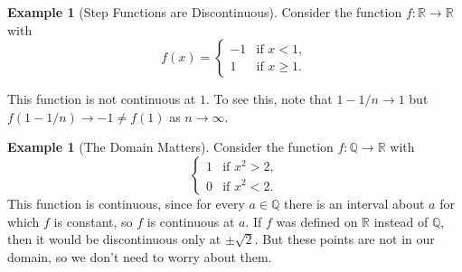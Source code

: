 \documentclass[11pt, a4paper]{article}
\theoremstyle{definition}
\newtheorem{example}[theorem]{Example}
\newcommand{\Q}{\mathbb{Q}}
\newcommand{\R}{\mathbb{R}}
\begin{document}
\begin{example}[Step Functions are Discontinuous]
	Consider the function $f : \R \rightarrow \R$ with
	$$
	f(x) = \begin{cases}
        -1 &\mbox{if } x < 1, \\
        1 &\mbox{if } x \geq 1.
       \end{cases}
	$$
	\begin{center}
	\end{center}

	This function is not continuous at $1$. To see this, note that $1 - 1/n \rightarrow 1$ but $f(1 - 1/n) \rightarrow -1 \neq f(1)$ as $n \rightarrow \infty$.
\end{example}

\begin{example}[The Domain Matters]
Consider the function $f: \Q \rightarrow \R$ with
$$
\begin{cases}
	1 &\mbox{if } x^2 > 2, \\
	0 &\mbox{if } x^2 < 2.
   \end{cases}
$$
This function is continuous, since for every $a \in \Q$ there is an interval about $a$ for which $f$ is constant, so $f$ is continuous at $a$. If $f$ was defined on $\R$ instead of $\Q$, then it would be discontinuous only at $\pm\sqrt{2}$. But these points are not in our domain, so we don't need to worry about them.
\end{example}
\end{document}
